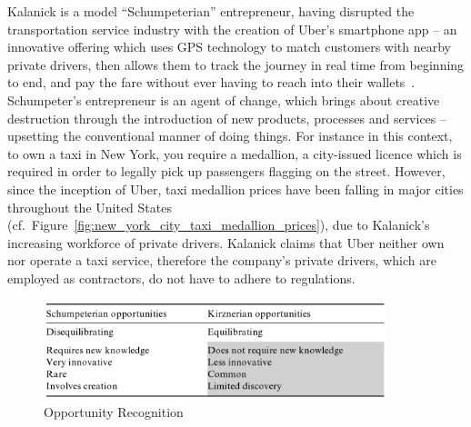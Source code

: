     Kalanick is a model ``Schumpeterian'' entrepreneur, having disrupted the transportation service industry with the creation of Uber's smartphone app -- an innovative offering which uses GPS technology to match customers with nearby private drivers, then allows them to track the journey in real time from beginning to end, and pay the fare without ever having to reach into their wallets~\parencite{gatehouse2015}. Schumpeter's entrepreneur is an agent of change, which brings about creative destruction through the introduction of new products, processes and services -- upsetting the conventional manner of doing things. For instance in this context, to own a taxi in New York, you require a medallion, a city-issued licence which is required in order to legally pick up passengers flagging on the street. However, since the inception of Uber, taxi medallion prices have been falling in major cities throughout the United States (cf.\ Figure~\ref{fig:new_york_city_taxi_medallion_prices}), due to Kalanick's increasing workforce of private drivers. Kalanick claims that Uber neither own nor operate a taxi service, therefore the company's private drivers, which are employed as contractors, do not have to adhere to regulations.

    \begin{figure}
      \centering
      \begin{minipage}{10cm}
        \centering
        \includegraphics[width=10cm]{inc/opportunity_recognition.png}
        \caption[Opportunity Recognition]{Opportunity Recognition}
        \label{fig:opportunity_recognition}
      \end{minipage}
    \end{figure}

